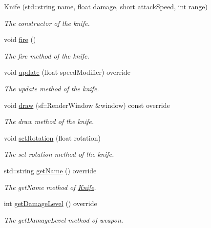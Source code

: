 \begin{DoxyCompactItemize}
\item 
\hyperlink{class_knife_a4556bddf2c8705c79f192157ad98e42b}{Knife} (std\+::string name, float damage, short attack\+Speed, int range)
\begin{DoxyCompactList}\small\item\em The constructor of the knife. \end{DoxyCompactList}\item 
void \hyperlink{class_knife_af90e68f00a874b1bc75a1bc91b8c84d8}{fire} ()
\begin{DoxyCompactList}\small\item\em The fire method of the knife. \end{DoxyCompactList}\item 
void \hyperlink{class_knife_ac861c5829858e00f82cbfdddb4a7d0b4}{update} (float speed\+Modifier) override
\begin{DoxyCompactList}\small\item\em The update method of the knife. \end{DoxyCompactList}\item 
void \hyperlink{class_knife_a747c0cc2dcc81df06f63cc4259ed3556}{draw} (sf\+::\+Render\+Window \&window) const override
\begin{DoxyCompactList}\small\item\em The draw method of the knife. \end{DoxyCompactList}\item 
void \hyperlink{class_knife_a3a6345197e3a146c311e28145a257665}{set\+Rotation} (float rotation)
\begin{DoxyCompactList}\small\item\em The set rotation method of the knife. \end{DoxyCompactList}\item 
std\+::string \hyperlink{class_knife_a45e5c10b9b6aa04b0ef71fbbf25269d4}{get\+Name} () override
\begin{DoxyCompactList}\small\item\em The get\+Name method of \hyperlink{class_knife}{Knife}. \end{DoxyCompactList}\item 
int \hyperlink{class_knife_a9a3afd5408784399fc9cc7afc33eb3cd}{get\+Damage\+Level} () override
\begin{DoxyCompactList}\small\item\em The get\+Damage\+Level method of weapon. \end{DoxyCompactList}\item 

\end{DoxyCompactItemize}
